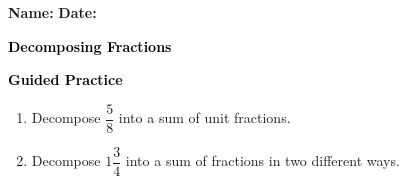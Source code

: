 \documentclass[12pt, letterpaper, fleqn]{article}
\begin{document}
\textbf{Name:} \underline{\hspace{5cm}}
\hfill
\textbf{Date:} \underline{\hspace{3cm}}\\

\begin{tcolorbox}[colback=customteal!20]
    \large\textcolor{black}{\textbf{Decomposing Fractions}}
\end{tcolorbox}
\newpage
\begin{tcolorbox}[colback=customteal!20]
    \large\textcolor{black}{\textbf{Guided Practice}}
\end{tcolorbox}
\begin{enumerate}[itemsep=3.5cm, leftmargin=0.6cm]
\item Decompose $\dfrac{5}{8}$ into a sum of unit fractions.
\vspace{3cm}
\item Decompose $1\dfrac{3}{4}$ into a sum of fractions in two different ways.
\end{enumerate}
\end{document}
